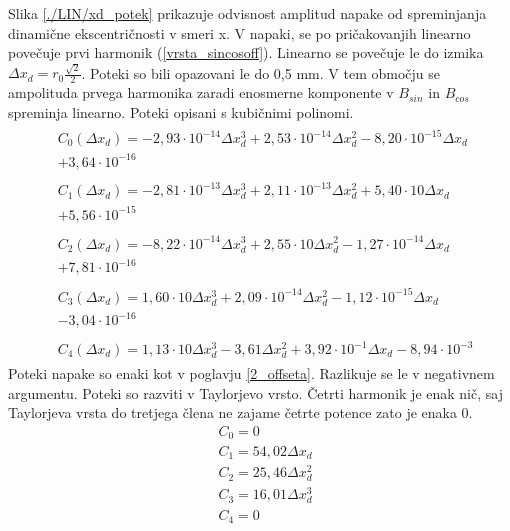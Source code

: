 \newpage
Slika \ref{./LIN/xd_potek} prikazuje odvisnost amplitud napake od spreminjanja dinamične ekscentričnosti v smeri x. V napaki, se po pričakovanjih linearno povečuje prvi harmonik (\ref{vrsta_sincosoff}). Linearno se povečuje le do izmika $\Delta x_d = r_0 \frac{\sqrt{2}}{2}$. Poteki so bili opazovani le do 0,5 mm. V tem območju se ampolituda prvega harmonika zaradi enosmerne komponente v $B_{sin}$ in $B_{cos}$ spreminja linearno.
Poteki opisani s kubičnimi polinomi.
\begin{eqnarray}
\label{nap_lin_xd}
&\begin{split}C_0(\Delta x_d) =-2,93\cdot 10^{-14}\Delta x_d^{3}+2,53\cdot 10^{-14}\Delta x_d^{2}-8,20\cdot 10^{-15}\Delta x_d\\+3,64\cdot 10^{-16}\end{split} \\
&\begin{split}C_1(\Delta x_d) =-2,81\cdot 10^{-13}\Delta x_d^{3}+2,11\cdot 10^{-13}\Delta x_d^{2}+5,40\cdot 10\Delta x_d\\+5,56\cdot 10^{-15} \end{split}\\      
&\begin{split}C_2(\Delta x_d) =-8,22\cdot 10^{-14}\Delta x_d^{3}+2,55\cdot 10\Delta x_d^{2}-1,27\cdot 10^{-14}\Delta x_d\\+7,81\cdot 10^{-16} \end{split}\\      
&\begin{split}C_3(\Delta x_d) =1,60\cdot 10\Delta x_d^{3}+2,09\cdot 10^{-14}\Delta x_d^{2}-1,12\cdot 10^{-15}\Delta x_d\\-3,04\cdot 10^{-16} \end{split}\\       
&\begin{split}C_4(\Delta x_d) =1,13\cdot 10\Delta x_d^{3}-3,61\Delta x_d^{2}+3,92\cdot 10^{-1}\Delta x_d-8,94\cdot 10^{-3}\end{split}
\end{eqnarray}
Poteki napake so enaki kot v poglavju \ref{2_offseta}. Razlikuje se le v negativnem argumentu. Poteki so razviti v Taylorjevo vrsto. Četrti harmonik je enak nič, saj Taylorjeva vrsta do tretjega člena ne zajame četrte potence zato je enaka 0.
\begin{eqnarray}
&C_0 =0\\
&C_1 =54,02\Delta x_d\\     
&C_2 =25,46\Delta x_d^{2}\\             
&C_3 =16,01\Delta x_d^{3}\\         
&C_4 =0            
\end{eqnarray}
